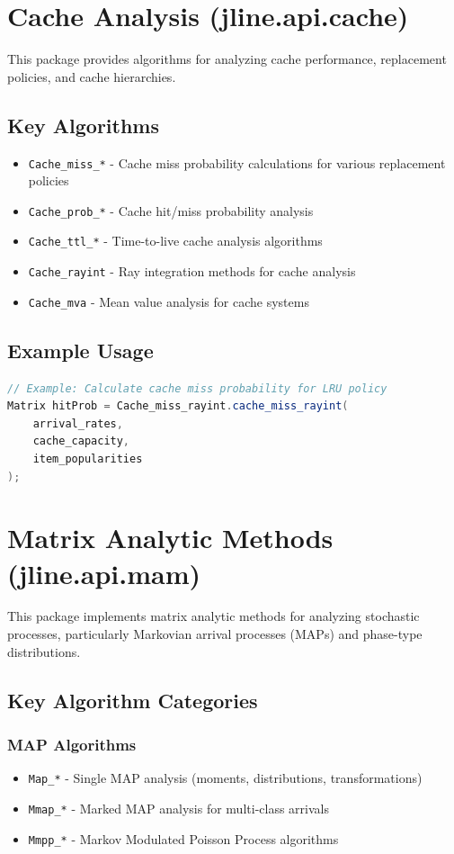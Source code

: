 \section{Cache Analysis (jline.api.cache)}

This package provides algorithms for analyzing cache performance, replacement policies, and cache hierarchies.

\subsection{Key Algorithms}
\begin{itemize}
\item \texttt{Cache\_miss\_*} - Cache miss probability calculations for various replacement policies
\item \texttt{Cache\_prob\_*} - Cache hit/miss probability analysis
\item \texttt{Cache\_ttl\_*} - Time-to-live cache analysis algorithms
\item \texttt{Cache\_rayint} - Ray integration methods for cache analysis
\item \texttt{Cache\_mva} - Mean value analysis for cache systems
\end{itemize}

\subsection{Example Usage}
\begin{lstlisting}[language = java, basicstyle=\ttfamily\scriptsize]
// Example: Calculate cache miss probability for LRU policy
Matrix hitProb = Cache_miss_rayint.cache_miss_rayint(
    arrival_rates, 
    cache_capacity, 
    item_popularities
);
\end{lstlisting}

\section{Matrix Analytic Methods (jline.api.mam)}

This package implements matrix analytic methods for analyzing stochastic processes, particularly Markovian arrival processes (MAPs) and phase-type distributions.

\subsection{Key Algorithm Categories}

\subsubsection{MAP Algorithms}
\begin{itemize}
\item \texttt{Map\_*} - Single MAP analysis (moments, distributions, transformations)
\item \texttt{Mmap\_*} - Marked MAP analysis for multi-class arrivals
\item \texttt{Mmpp\_*} - Markov Modulated Poisson Process algorithms
\end{itemize}

